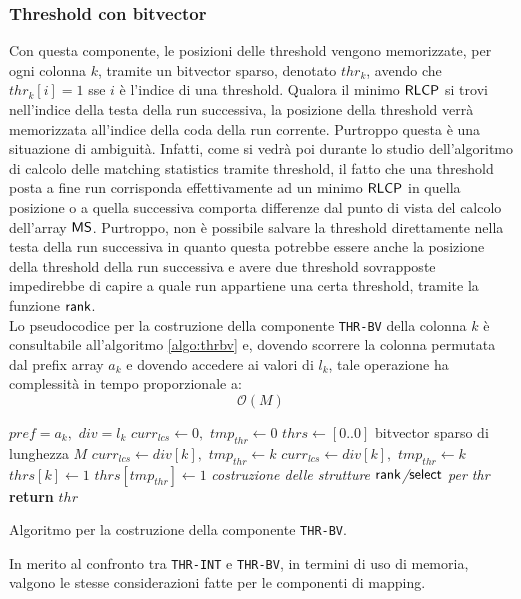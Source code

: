 \subsubsection{Threshold con bitvector}
Con questa componente, le posizioni delle threshold vengono
memorizzate, per ogni colonna $k$, tramite un bitvector sparso, denotato
$thr_k$, avendo che $thr_k[i]=1$ sse $i$ è l'indice di una threshold.
Qualora il minimo $\mbox{\rm {\sf RLCP}}$ si trovi nell'indice della testa della run
successiva, la posizione della threshold verrà memorizzata all'indice
della coda della run corrente. Purtroppo questa è una situazione di ambiguità.
Infatti, come si vedrà poi durante lo studio dell'algoritmo di calcolo delle
matching statistics tramite threshold, il fatto che una threshold posta a fine
run corrisponda effettivamente ad un minimo $\mbox{\rm {\sf RLCP}}$ in quella posizione o a
quella successiva comporta differenze dal punto di vista del calcolo dell'array
$\mbox{\rm {\sf MS}}$. 
Purtroppo, non è possibile salvare la threshold direttamente nella testa della
run successiva in quanto questa potrebbe essere anche la posizione della
threshold della run successiva e avere due threshold sovrapposte impedirebbe di
capire a quale run appartiene una certa threshold, tramite la funzione
$\mbox{\rm {\sf rank}}$. \\
Lo pseudocodice per la costruzione della componente
\texttt{THR-BV} della colonna $k$ è consultabile all'algoritmo \ref{algo:thrbv}
e, dovendo scorrere la colonna permutata dal prefix array $a_k$ e dovendo
accedere ai valori di $l_k$, tale operazione ha complessità in tempo
proporzionale a:
\begin{equation}
  \label{eq:thrbv}
  \mathcal{O}(M)
\end{equation}
\begin{algorithm}
  \begin{algorithmic}
    \Comment $pref=a_k,\,\,div=l_k$
    \State $curr_{lcs}\gets 0,\,\,tmp_{thr}\gets 0$
    \State $thrs\gets[0..0]$
    \Comment bitvector sparso di lunghezza $M$
    \For {\textit{every} $k\in\left[0,\,\, M\right)$}
    \State $curr_{lcs}\gets div[k],\,\,tmp_{thr}\gets k$
    \EndIf
    \State $curr_{lcs}\gets div[k],\,\,tmp_{thr}\gets k$
    \EndIf
    \State $thrs[k]\gets 1$
    \Else
    \State $thrs[tmp_{thr}]\gets 1$
    \EndIf
    \EndIf
    \EndFor
    \State \textit{costruzione delle strutture $\mbox{\rm {\sf rank}}$/$\mbox{\rm {\sf select}}$ per thr}
    \State \textbf{return} $thr$  
    \EndFunction
  \end{algorithmic}
  \caption{Algoritmo per la costruzione della componente \texttt{THR-BV}.}
  \label{algo:thrbv}
\end{algorithm}
\noindent
In merito al confronto tra \texttt{THR-INT} e \texttt{THR-BV}, in termini di uso
di memoria, valgono le stesse considerazioni fatte per le componenti di mapping.
